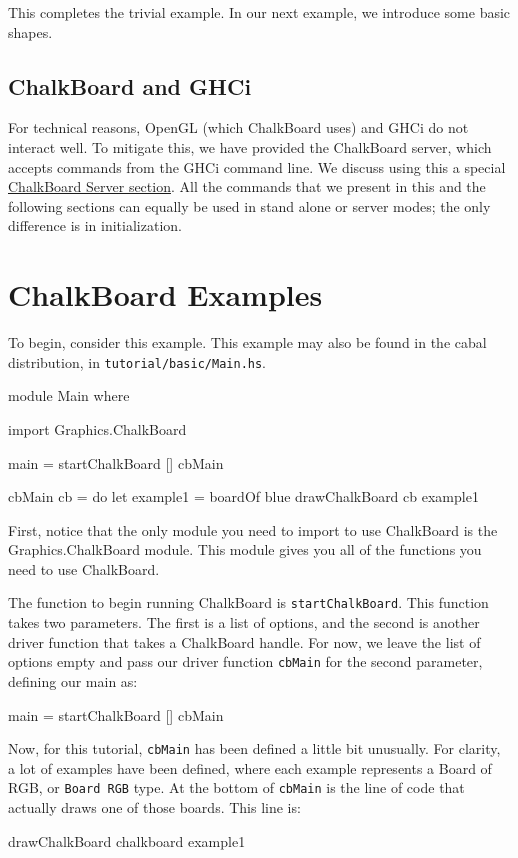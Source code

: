 \documentclass{article}
\begin{document}
This completes the trivial example. In our next example, we introduce some basic shapes.

\subsection{ChalkBoard and GHCi}

For technical reasons, OpenGL (which ChalkBoard uses) and GHCi do not interact well. To mitigate this,
we have provided the ChalkBoard server, which accepts commands from the GHCi
command line. We discuss using this a special \hyperref[sec:server]{ChalkBoard Server section}. All
the commands that we present in this and the following sections can equally
be used in stand alone or server modes; the only difference is in initialization.

\newpage
\section{ChalkBoard Examples}

To begin, consider this example. 
This example may also be found in the cabal distribution,
in \verb|tutorial/basic/Main.hs|.
\begin{DSL}[label={Main.hs}]
module Main where

import Graphics.ChalkBoard

main = startChalkBoard [] cbMain

cbMain cb = do
        let example1 = boardOf blue
        drawChalkBoard cb example1
\end{DSL}

First,
notice that the only module you need to import to use ChalkBoard is
the Graphics.ChalkBoard module. This module gives you all of the
functions you need to use ChalkBoard.


The function to begin running ChalkBoard is \texttt{startChalkBoard}. This function takes two parameters. The first is a list of options, and the second is another driver function that takes a ChalkBoard handle. For now, we leave the list of options empty and pass our driver function \texttt{cbMain} for the second parameter, defining our main as:
\begin{DSL}
main = startChalkBoard [] cbMain
\end{DSL}


Now, for this tutorial, \texttt{cbMain} has been defined a little bit unusually. For clarity, a lot of examples have been defined, where each example represents a Board of RGB, or \texttt{Board RGB} type. At the bottom of \texttt{cbMain} is the line of code that actually draws one of those boards. This line is:
\begin{DSL}
drawChalkBoard chalkboard example1
\end{DSL}
\end{document}
